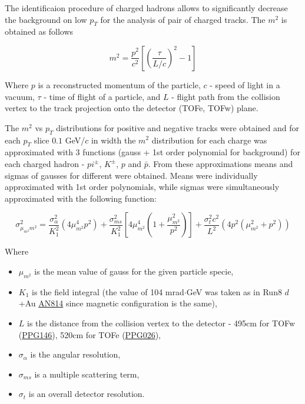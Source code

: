 The identificaion procedure of charged hadrons allows to significantly decrease the background on low $p_T$ for the analysis of pair of charged tracks. The $m^2$ is obtained as follows

\begin{equation}
	m^2 = \frac{p^2}{c^2} \left[ \left( \frac{\tau}{L/c} \right)^2 - 1 \right]
\end{equation}

Where $p$ is a reconstructed momentum of the particle, $c$ - speed of light in a vacuum, $\tau$ - time of flight of a particle, and $L$ - flight path from the collision vertex to the track projection onto the detector (TOFe, TOFw) plane.

The $m^2$ vs $p_T$ distributions for positive and negative tracks were obtained and for each $p_T$ slice $0.1$ GeV/$c$ in width the $m^2$ distribution for each charge was approximated with 3 functions (gauss + 1st order polynomial for background) for each charged hadron - $pi^\pm$, $K^\pm$, $p$ and $\bar{p}$. From these approximations means and sigmas of gausses for different \pT were obtained. Means were individually approximated with 1st order polynomials, while sigmas were simultaneously approximated with the following function:

\begin{equation}
   \sigma^2_{\mu_{m^2}m^2} = \frac{\sigma_{\alpha}^2}{K_1^2} \left(4\mu_{m^2}^4 p^2 \right) + \frac{\sigma_{ms}^2}{K_1^2} \left[4\mu_{m^2}^4 \left( 1+\frac{\mu_{m^2}^2}{p^2} \right) \right] + \frac{\sigma_t^2 c^2}{L^2} \left( 4p^2(\mu_{m^2}^2+p^2) \right)
\end{equation}

Where
\begin{itemize}
   \item $\mu_{m^2}$ is the mean value of gauss for the given particle specie,
   \item $K_1$ is the field integral (the value of 104 mrad$\cdot$GeV was taken as in Run8 $d$+Au \href{https://phenix-intra.sdcc.bnl.gov/phenix/WWW/p/draft/belmonrj/AnalysisNotes/ananoterun8.pdf}{AN814} since magnetic configuration is the same),
   \item $L$ is the distance from the collision vertex to the detector - 495cm for TOFw (\href{http://arxiv.org/abs/1304.3410}{PPG146}), 520cm for TOFe (\href{http://arxiv.org/abs/nucl-ex/0307022}{PPG026}), 
	\item $\sigma_{\alpha}$ is the angular resolution,
	\item $\sigma_{ms}$ is a multiple scattering term,
	\item $\sigma_t$ is an overall detector resolution.
\end{itemize}

